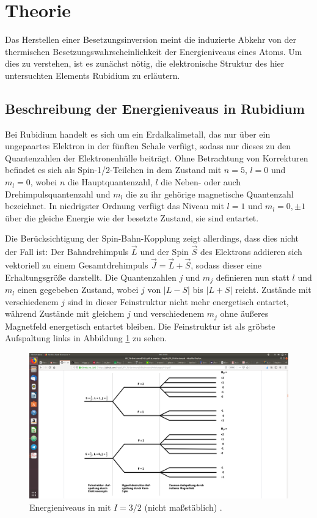 \section{Theorie}
\label{sec:Theorie}
  Das Herstellen einer Besetzungsinversion meint die induzierte Abkehr von der thermischen Besetzungswahrscheinlichkeit der Energieniveaus eines Atoms.
  Um dies zu verstehen, ist es zunächst nötig, die elektronische Struktur des hier untersuchten Elements Rubidium zu erläutern.

  \subsection{Beschreibung der Energieniveaus in Rubidium}
  \label{subsec:energieniveaus}
  Bei Rubidium handelt es sich um ein Erdalkalimetall, das nur über ein ungepaartes Elektron in der fünften Schale verfügt, sodass nur dieses zu den Quantenzahlen der Elektronenhülle beiträgt.
  Ohne Betrachtung von Korrekturen befindet es sich als Spin-1/2-Teilchen in dem Zustand mit $n=5$, $l=0$ und $m_l=0$, wobei $n$ die Hauptquantenzahl, $l$ die Neben- oder auch Drehimpulsquantenzahl und $m_l$ die zu ihr gehörige magnetische Quantenzahl bezeichnet. In niedrigster Ordnung verfügt das Niveau mit $l=1$ und $m_l=0,\pm1$ über die gleiche Energie wie der besetzte Zustand, sie sind entartet.

  Die Berücksichtigung der Spin-Bahn-Kopplung zeigt allerdings, dass dies nicht der Fall ist: Der Bahndrehimpuls $\vec{L}$ und der Spin $\vec{S}$ des Elektrons addieren sich vektoriell zu einem Gesamtdrehimpuls $\vec{J}=\vec{L}+\vec{S}$, sodass dieser eine Erhaltungsgröße darstellt. Die Quantenzahlen $j$ und $m_j$ definieren nun statt $l$ und $m_l$ einen gegebeben Zustand, wobei $j$ von $\lvert L - S \rvert$ bis $\lvert L + S \rvert$ reicht. Zustände mit verschiedenem $j$ sind in dieser Feinstruktur nicht mehr energetisch entartet, während Zustände mit gleichem $j$ und verschiedenem $m_j$ ohne äußeres Magnetfeld energetisch entartet bleiben.
  Die Feinstruktur ist als gröbste Aufspaltung links in Abbildung \ref{fig:energieniveaus} zu sehen.

  \begin{figure}
    \centering
    \includegraphics[width=\textwidth]{pictures/energieniveaus.png}
    \caption{Energieniveaus in  mit $I=3/2$ (nicht maßstäblich) \cite{stehendeWelle}.}
    \label{fig:energieniveaus}
  \end{figure}

